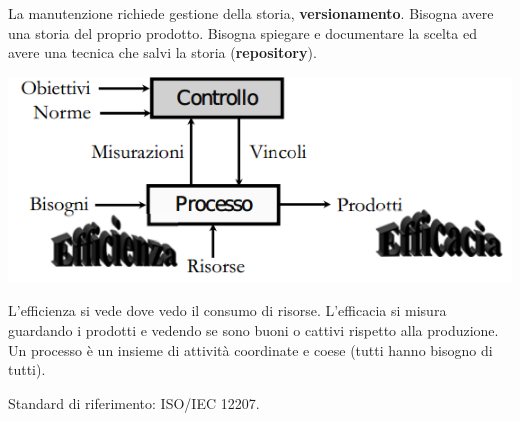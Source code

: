 La manutenzione richiede gestione della storia, \textbf{versionamento}. Bisogna avere una storia del proprio prodotto. Bisogna spiegare e documentare la scelta ed avere una tecnica che salvi la storia (\textbf{repository}).

\begin{center}

\includegraphics[width=0.75\columnwidth]{img2} %

\end{center}

L'efficienza si vede dove vedo il consumo di risorse. L'efficacia si misura guardando i prodotti e vedendo se sono buoni o cattivi rispetto alla produzione. Un processo è un insieme di attività coordinate e coese (tutti hanno bisogno di tutti).

Standard di riferimento: ISO/IEC 12207.


